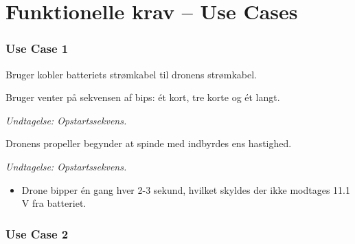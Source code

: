 \documentclass[Main]{subfiles}
\begin{document}
\chapter{Funktionelle krav -- Use Cases}\label{Sec:chap3}


\subsection{Use Case 1}

\begin{UseCase}

	\begin{normFor}
	\item Bruger kobler batteriets strømkabel til dronens strømkabel.
	\item Bruger venter på sekvensen af bips: ét kort, tre korte og ét langt.
	\item[]	\textit{Undtagelse: Opstartssekvens.}
	\item Dronens propeller begynder at spinde med indbyrdes ens hastighed.
	\end{normFor} 

	\begin{normFor}
	\item \textit{Undtagelse: Opstartssekvens.}
	\begin{itemize}
	\item Drone bipper én gang hver 2-3 sekund, hvilket skyldes der ikke modtages 11.1 V fra batteriet.
	\end{itemize}
	\end{normFor} 
\end{UseCase}


\newpage
\subsection{Use Case 2}
\end{document}
